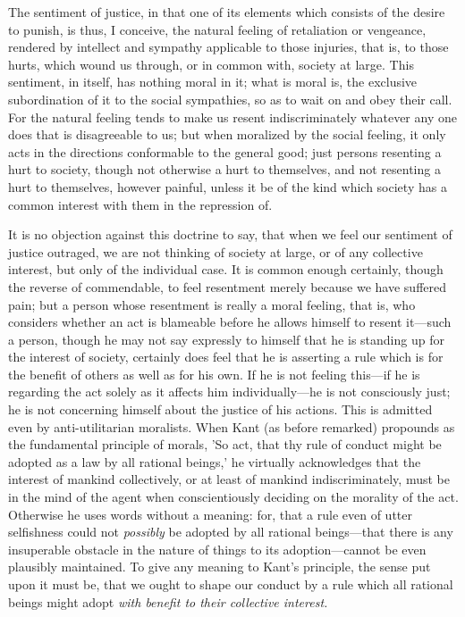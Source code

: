\documentclass[12pt]{report}
\begin{document}
The sentiment of justice, in that one of its elements which consists of the desire to punish, is thus, I conceive, the natural feeling of retaliation or vengeance, rendered by intellect and sympathy applicable to those injuries, that is, to those hurts, which wound us through, or in common with, society at large. This sentiment, in itself, has nothing moral in it; what is moral is, the exclusive subordination of it to the social sympathies, so as to wait on and obey their call. For the natural feeling tends to make us resent indiscriminately whatever any one does that is disagreeable to us; but when moralized by the social feeling, it only acts in the directions conformable to the general good; just persons resenting a hurt to society, though not otherwise a hurt to themselves, and not resenting a hurt to themselves, however painful, unless it be of the kind which society has a common interest with them in the repression of.

It is no objection against this doctrine to say, that when we feel our sentiment of justice outraged, we are not thinking of society at large, or of any collective interest, but only of the individual case. It is common enough certainly, though the reverse of commendable, to feel resentment merely because we have suffered pain; but a person whose resentment is really a moral feeling, that is, who considers whether an act is blameable before he allows himself to resent it—such a person, though he may not say expressly to himself that he is standing up for the interest of society, certainly does feel that he is asserting a rule which is for the benefit of others as well as for his own. If he is not feeling this—if he is regarding the act solely as it affects him individually—he is not consciously just; he is not concerning himself about the justice of his actions. This is admitted even by anti-utilitarian moralists. When Kant (as before remarked) propounds as the fundamental principle of morals, 'So act, that thy rule of conduct might be adopted as a law by all rational beings,' he virtually acknowledges that the interest of mankind collectively, or at least of mankind indiscriminately, must be in the mind of the agent when conscientiously deciding on the morality of the act. Otherwise he uses words without a meaning: for, that a rule even of utter selfishness could not \emph{possibly} be adopted by all rational beings—that there is any insuperable obstacle in the nature of things to its adoption—cannot be even plausibly maintained. To give any meaning to Kant's principle, the sense put upon it must be, that we ought to shape our conduct by a rule which all rational beings might adopt \emph{with benefit to their collective interest.}
\end{document}
